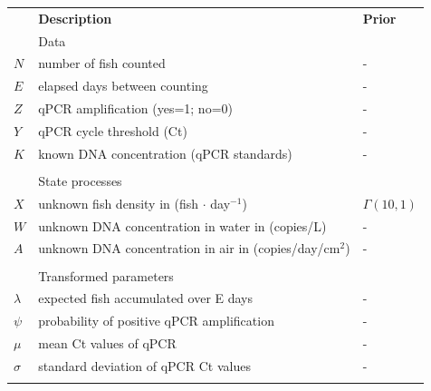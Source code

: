 \documentclass{article}
\begin{document}
\begin{table}[h]
    \centering
    \begin{tabular}{lll}
         & \textbf{Description} & \textbf{Prior} \\
&Data & \\
\hline
$N$ & number of fish counted & - \\
$E$ & elapsed days between counting & - \\
$Z$ & qPCR amplification (yes=1; no=0) & - \\
$Y$ & qPCR cycle threshold (Ct) & - \\
$K$ & known DNA concentration (qPCR standards) & - \\

&&\\
&State processes&\\
\hline
$X$ & unknown fish density in (fish $\cdot$ day$^{-1}$) & $\Gamma(10,1)$ \\
$W$ & unknown DNA concentration in water in (copies/L) & - \\
$A$ & unknown DNA concentration in air in (copies/day/cm$^2$) & - \\
&&\\

&Transformed parameters&\\
\hline
$\lambda$& expected fish accumulated over E days & - \\
$\psi$& probability of positive qPCR amplification & - \\
$\mu$& mean Ct values of qPCR & - \\
$\sigma$& standard deviation of qPCR Ct values & - \\
&&\\


\end{tabular}
\end{table}
\end{document}
